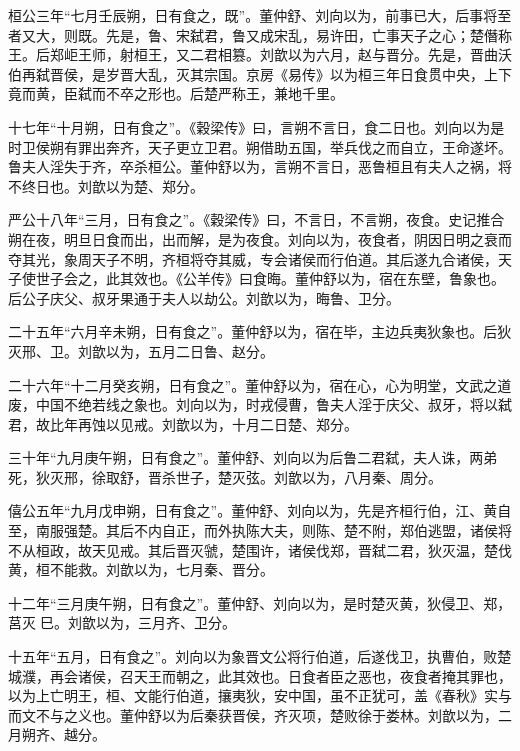 \documentclass[12pt,UTF8]{ctexbook}
\begin{document}
桓公三年“七月壬辰朔，日有食之，既”。董仲舒、刘向以为，前事已大，后事将至者又大，则既。先是，鲁、宋弑君，鲁又成宋乱，易许田，亡事天子之心；楚僭称王。后郑岠王师，射桓王，又二君相篡。刘歆以为六月，赵与晋分。先是，晋曲沃伯再弑晋侯，是岁晋大乱，灭其宗国。京房《易传》以为桓三年日食贯中央，上下竟而黄，臣弑而不卒之形也。后楚严称王，兼地千里。



十七年“十月朔，日有食之”。《穀梁传》曰，言朔不言日，食二日也。刘向以为是时卫侯朔有罪出奔齐，天子更立卫君。朔借助五国，举兵伐之而自立，王命遂坏。鲁夫人淫失于齐，卒杀桓公。董仲舒以为，言朔不言日，恶鲁桓且有夫人之祸，将不终日也。刘歆以为楚、郑分。



严公十八年“三月，日有食之”。《穀梁传》曰，不言日，不言朔，夜食。史记推合朔在夜，明旦日食而出，出而解，是为夜食。刘向以为，夜食者，阴因日明之衰而夺其光，象周天子不明，齐桓将夺其威，专会诸侯而行伯道。其后遂九合诸侯，天子使世子会之，此其效也。《公羊传》曰食晦。董仲舒以为，宿在东壁，鲁象也。后公子庆父、叔牙果通于夫人以劫公。刘歆以为，晦鲁、卫分。



二十五年“六月辛未朔，日有食之”。董仲舒以为，宿在毕，主边兵夷狄象也。后狄灭邢、卫。刘歆以为，五月二日鲁、赵分。



二十六年“十二月癸亥朔，日有食之”。董仲舒以为，宿在心，心为明堂，文武之道废，中国不绝若线之象也。刘向以为，时戎侵曹，鲁夫人淫于庆父、叔牙，将以弑君，故比年再蚀以见戒。刘歆以为，十月二日楚、郑分。



三十年“九月庚午朔，日有食之”。董仲舒、刘向以为后鲁二君弑，夫人诛，两弟死，狄灭邢，徐取舒，晋杀世子，楚灭弦。刘歆以为，八月秦、周分。



僖公五年“九月戊申朔，日有食之”。董仲舒、刘向以为，先是齐桓行伯，江、黄自至，南服强楚。其后不内自正，而外执陈大夫，则陈、楚不附，郑伯逃盟，诸侯将不从桓政，故天见戒。其后晋灭虢，楚围许，诸侯伐郑，晋弑二君，狄灭温，楚伐黄，桓不能救。刘歆以为，七月秦、晋分。



十二年“三月庚午朔，日有食之”。董仲舒、刘向以为，是时楚灭黄，狄侵卫、郑，莒灭巳。刘歆以为，三月齐、卫分。



十五年“五月，日有食之”。刘向以为象晋文公将行伯道，后遂伐卫，执曹伯，败楚城濮，再会诸侯，召天王而朝之，此其效也。日食者臣之恶也，夜食者掩其罪也，以为上亡明王，桓、文能行伯道，攘夷狄，安中国，虽不正犹可，盖《春秋》实与而文不与之义也。董仲舒以为后秦获晋侯，齐灭项，楚败徐于娄林。刘歆以为，二月朔齐、越分。
\end{document}
